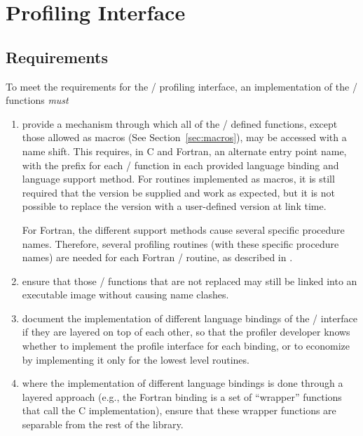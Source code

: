 \section{Profiling Interface}

\label{sec:prof}
\label{chap:prof}

\subsection{Requirements}
\label{sec:prof:require}

To meet the requirements for the \MPI/ profiling interface, an
implementation of the \MPI/ functions \emph{must}
\begin{enumerate}
\item provide a mechanism through which all of the \MPI/ defined functions,
  except those allowed as macros (See Section~\ref{sec:macros}), may be
  accessed with a name shift.  This requires, in C and Fortran, an
  alternate entry point name, with the prefix  for each \mpi/
   function in each provided language binding and
  language support method.  For routines implemented as macros, it is still
  required that the  version be supplied and work as
  expected, but it is not possible to replace the
   version with a user-defined version at link time.
 
  For Fortran, the different support methods cause several specific
  procedure names.  Therefore, several profiling routines (with these
  specific procedure names) are needed for each Fortran \MPI/ routine, as
  described in .

\item ensure that those \MPI/ functions that are not replaced may still be
  linked into an executable image without causing name clashes.

\item document the implementation of different language bindings of the
  \MPI/ interface if they are layered on top of each other, so that the
  profiler developer knows whether to implement the profile interface
  for each binding, or to economize by implementing it only for the lowest
  level routines.

\item where the implementation of different language bindings is done
  through a layered approach (e.g., the Fortran binding is a set of
  ``wrapper'' functions that  call the C implementation), ensure that these
  wrapper functions are separable from the rest of the library.


\end{enumerate}
